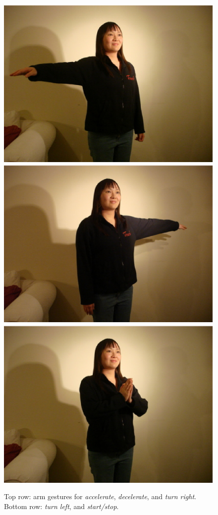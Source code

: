 \documentclass[12pt,a4,notitlepage]{report}
\renewcommand{\_}{\texttt{\symbol{95}}}
\newcommand{\<}{\texttt{\symbol{60}}}
\renewcommand{\>}{\texttt{\symbol{62}}}
\begin{document}
\begin{figure}
\includegraphics[scale=0.3,angle=0]{images/left.ps}
\includegraphics[scale=0.3,angle=0]{images/right.ps}
\includegraphics[scale=0.3,angle=0]{images/startstop.ps}
\caption{Top row: arm gestures for \textit{accelerate}, \textit{decelerate}, and \textit{turn right}. 
Bottom row: \textit{turn left}, and \textit{start/stop}.}
\label{gestures}
\end{figure}
\end{document}

